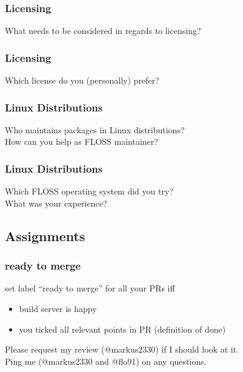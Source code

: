 \breakframe

\begin{frame}
	\frametitle{Licensing}

	\begin{task}
	What needs to be considered in regards to licensing?
	\end{task}
\end{frame}


\begin{frame}
	\frametitle{Licensing}

	\begin{task}
	Which license do you (personally) prefer?
	\end{task}
\end{frame}

\begin{frame}
	\frametitle{Linux Distributions}

	\begin{task}
	Who maintains packages in Linux distributions? \\
	How can you help as FLOSS maintainer?
	\end{task}
\end{frame}


\begin{frame}
	\frametitle{Linux Distributions}

	\begin{task}
	Which FLOSS operating system did you try? \\
	What was your experience?
	\end{task}
\end{frame}

\breakframe

\subsection{Assignments}

\begin{frame}
	\frametitle{ready to merge}

	set label ``ready to merge'' for all your PRs iff

	\vspace{1cm}

	\begin{itemize}
	\item build server is happy
	\item you ticked all relevant points in PR (definition of done)
	\end{itemize}

	\vspace{1cm}

	Please request my review (@markus2330) if I should look at it. \\
	Ping me (@markus2330 and @flo91) on any questions.
\end{frame}

